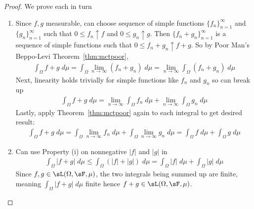 \documentclass[12pt]{article}
\theoremstyle{plain}
\theoremstyle{definition}
\theoremstyle{remark}
\newcommand{\ninf}{_{n=1}^\infty}
\newcommand{\limn}{\lim_{n\rightarrow\infty}}
\begin{document}
\begin{proof}
We prove each in turn
\begin{enumerate}[label=(\roman*)]
  \item Since $f,g$ measurable, can choose sequence of simple functions
    $\{f_n\}\ninf$ and $\{g_n\}\ninf$
    such that $0\leq f_n\uparrow f$ and $0\leq g_n\uparrow g$.
    Then $\{f_n+g_n\}\ninf$ is a sequence of simple functions such that
    $0\leq f_n+g_n\uparrow f+g$. So by Poor Man's Beppo-Levi
    Theorem~\ref{thm:mctpoor},
    \begin{align*}
      \int_\Omega f+g\;d\mu
      = \int_\Omega \limn (f_n+g_n)\;d\mu
      = \limn \int_\Omega (f_n+g_n)\;d\mu
    \end{align*}
    Next, linearity holds trivially for simple functions like
    $f_n$ and $g_n$ so can break up
    \begin{align*}
      \int_\Omega f+g\;d\mu
      = \limn \int_\Omega f_n\;d\mu
      + \limn \int_\Omega g_n\;d\mu
    \end{align*}
    Lastly, apply Theorem~\ref{thm:mctpoor} again to each integral to
    get desired result:
    \begin{align*}
      \int_\Omega f+g\;d\mu
      = \int_\Omega \limn f_n\;d\mu
        + \int_\Omega \limn g_n\;d\mu
      = \int_\Omega f\;d\mu
        + \int_\Omega g\;d\mu
    \end{align*}
  \item Can use Property (i) on nonnegative $|f|$ and $|g|$ in
    \begin{align*}
      \int_\Omega |f+g|\;d\mu
      \leq
      \int_\Omega (|f|+|g|)\;d\mu
      =
      \int_\Omega |f|\;d\mu
      + \int_\Omega |g|\;d\mu
    \end{align*}
    Since $f,g\in\sL(\Omega,\sF,\mu)$, the two integrals being summed up
    are finite, meaning $\int_\Omega |f+g|\;d\mu$ finite hence
    $f+g\in\sL(\Omega,\sF,\mu)$.


\end{enumerate}
\end{proof}
\end{document}
